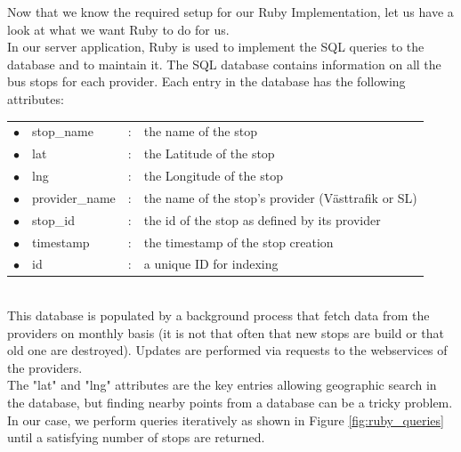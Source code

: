 Now that we know the required setup for our Ruby Implementation, let us have a look at what we want Ruby to do for us.\\

In our server application, Ruby is used to implement the SQL queries to the database and to maintain it. The SQL database contains information on all the bus stops for each provider. Each entry in the database has the following attributes:\\

\begin{tabular}{ l l l l }
$\bullet$ & stop\_name 	& : & the name of the stop\\
$\bullet$ & lat 			& : & the Latitude of the stop\\
$\bullet$ & lng 			& : & the Longitude of the stop\\
$\bullet$ & provider\_name & : & the name of the stop's provider (Västtrafik or SL)\\
$\bullet$ & stop\_id 		& : & the id of the stop as defined by its provider\\
$\bullet$ & timestamp 	& : & the timestamp of the stop creation\\
$\bullet$ & id		 	& : & a unique ID for indexing\\
\end{tabular}\\

This database is populated by a background process that fetch data from the providers on monthly basis (it is not that often that new stops are build or that old one are destroyed). Updates are performed via requests to the webservices of the providers.\\

The "lat" and "lng" attributes are the key entries allowing geographic search in the database, but finding nearby points from a database can be a tricky problem. In our case, we perform queries iteratively as shown in Figure \ref{fig:ruby_queries} until a satisfying number of stops are returned.\\

